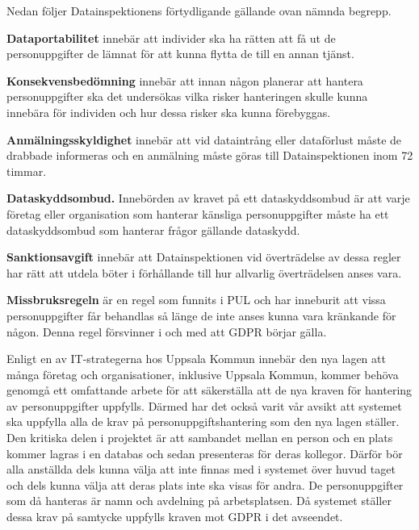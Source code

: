 \documentclass[swedish, a4paper,12pt]{article}
\begin{document}
Nedan följer Datainspektionens \cite{GDPRdatainspektionen} förtydligande gällande ovan nämnda begrepp.

\textbf{Dataportabilitet} innebär att individer ska ha rätten att få ut de personuppgifter de lämnat för att kunna flytta de till en annan tjänst.

\textbf{Konsekvensbedömning} innebär att innan någon planerar att hantera personuppgifter ska det undersökas vilka risker hanteringen skulle kunna innebära för individen och hur dessa risker ska kunna förebyggas.

\textbf{Anmälningsskyldighet} innebär att vid dataintrång eller dataförlust måste de drabbade informeras och en anmälning måste göras till Datainspektionen inom 72 timmar.

\textbf{Dataskyddsombud.} Innebörden av kravet på ett dataskyddsombud är att varje företag eller organisation som hanterar känsliga personuppgifter måste ha ett dataskyddsombud som hanterar frågor gällande dataskydd.

\textbf{Sanktionsavgift} innebär att Datainspektionen vid överträdelse av dessa regler har rätt att utdela böter i förhållande till hur allvarlig överträdelsen anses vara.

\textbf{Missbruksregeln} är en regel som funnits i PUL och har inneburit att vissa personuppgifter får behandlas så länge de inte anses kunna vara kränkande för någon. Denna regel försvinner i och med att GDPR börjar gälla.

Enligt en av IT-strategerna hos Uppsala Kommun innebär den nya lagen att många företag och organisationer, inklusive Uppsala Kommun, kommer behöva genomgå ett omfattande arbete för att säkerställa att de nya kraven för hantering av personuppgifter uppfylls. %
Därmed har det också varit vår avsikt att systemet ska uppfylla alla de krav på personuppgiftshantering som den nya lagen ställer. Den kritiska delen i projektet är att sambandet mellan en person och en plats kommer lagras i en databas och sedan presenteras för deras kollegor. Därför bör alla anställda dels kunna välja att inte finnas med i systemet över huvud taget och dels kunna välja att deras plats inte ska visas för andra. De personuppgifter som då hanteras är namn och avdelning på arbetsplatsen. Då systemet ställer dessa krav på samtycke uppfylls kraven mot GDPR i det avseendet.
\end{document}
